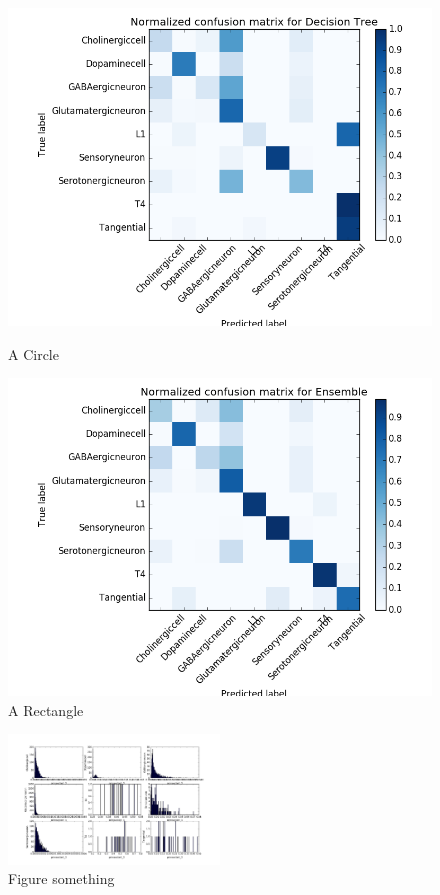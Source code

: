 \documentclass[10pt,twocolumn]{article}
\begin{document}
\begin{figure}[htbp] 
	\begin{minipage}{0.5\linewidth} 
		\centering 
		\includegraphics[width=\textwidth]{img/DTmatrix.png} 
		\caption{A Circle} 
		\label{fig:circle} 
	\end{minipage}%
	\begin{minipage}{0.5\linewidth} 
		\centering 
		\includegraphics[width=\textwidth]{img/ENSEMBLEmatrix.png}
		\caption{A Rectangle} 
		\label{fig:rectangle} 
	\end{minipage}
\end{figure}	

\begin{figure}[!ht]
	\centering
	\includegraphics[width=0.5\textwidth]{img/test_fig.png}
	\caption{Figure something}
	\label{fig:chi2}
\end{figure}
\end{document}
